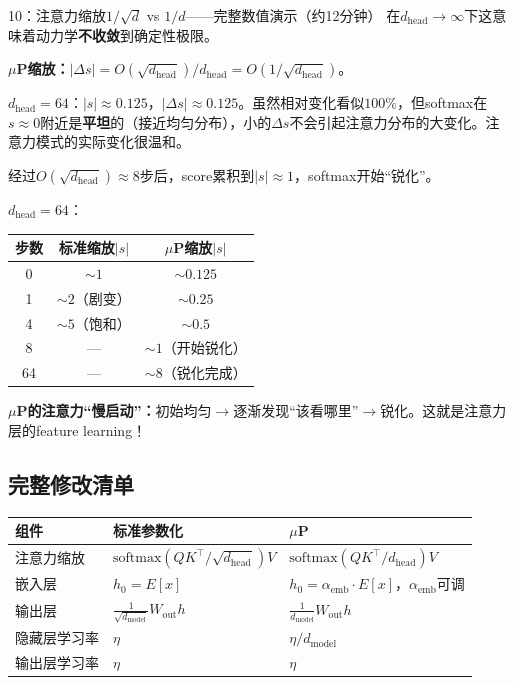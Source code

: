 \documentclass[11pt,a4paper]{article}
\begin{document}
\begin{handcalc}{10：注意力缩放$1/\sqrt{d}$ vs $1/d$——完整数值演示（约12分钟）}
在$d_{\text{head}}\to\infty$下这意味着动力学\textbf{不收敛}到确定性极限。

\medskip
\textbf{$\mu$P缩放：}$|\Delta s| = O(\sqrt{d_{\text{head}}})/d_{\text{head}} = O(1/\sqrt{d_{\text{head}}})$。

$d_{\text{head}}=64$：$|s|\approx 0.125$，$|\Delta s|\approx 0.125$。虽然相对变化看似$100\%$，但softmax在$s\approx 0$附近是\textbf{平坦}的（接近均匀分布），小的$\Delta s$不会引起注意力分布的大变化。注意力模式的实际变化很温和。

经过$O(\sqrt{d_{\text{head}}})\approx 8$步后，score累积到$|s|\approx 1$，softmax开始``锐化''。

$d_{\text{head}}=64$：
\begin{center}
\begin{tabular}{c|cc}
\toprule
步数 & 标准缩放$|s|$ & $\mu$P缩放$|s|$ \\
\midrule
0 & $\sim 1$ & $\sim 0.125$ \\
1 & $\sim 2$（剧变） & $\sim 0.25$ \\
4 & $\sim 5$（饱和） & $\sim 0.5$ \\
8 & --- & $\sim 1$（开始锐化） \\
64 & --- & $\sim 8$（锐化完成） \\
\bottomrule
\end{tabular}
\end{center}

\textbf{$\mu$P的注意力``慢启动''：}初始均匀$\to$逐渐发现``该看哪里''$\to$锐化。这就是注意力层的feature learning！
\end{handcalc}

\subsection{完整修改清单}

\begin{center}
\renewcommand{\arraystretch}{1.3}
\begin{tabular}{l|l|l}
\toprule
\textbf{组件} & \textbf{标准参数化} & \textbf{$\mu$P} \\
\midrule
注意力缩放 & $\text{softmax}(QK^\top/\sqrt{d_{\text{head}}})V$ & $\text{softmax}(QK^\top/d_{\text{head}})V$ \\
嵌入层 & $h_0 = E[x]$ & $h_0 = \alpha_{\text{emb}}\cdot E[x]$，$\alpha_{\text{emb}}$可调 \\
输出层 & $\frac{1}{\sqrt{d_{\text{model}}}}W_{\text{out}}h$ & $\frac{1}{d_{\text{model}}}W_{\text{out}}h$ \\
隐藏层学习率 & $\eta$ & $\eta/d_{\text{model}}$ \\
输出层学习率 & $\eta$ & $\eta$ \\
\bottomrule
\end{tabular}
\end{center}
\end{document}
